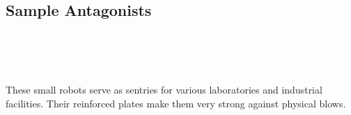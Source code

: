 
\subsection{Sample Antagonists}
\begin{multicols}{2}
\begin{ffcolpage}
\begin{mobstats}[earth=e,air=a,fire=f,water=w, hp=h, mp=m, arm=a, marm=q]
     \\
     \\
     \\
\end{mobstats} \pc
\tmtypeconstr{}
These small robots serve as sentries for various laboratories and industrial facilities. Their reinforced plates make them very strong against physical blows.
\end{ffcolpage}
\end{multicols}